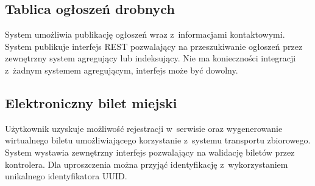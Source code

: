 \documentclass[12pt]{article}
\begin{document}
        \subsection*{Tablica ogłoszeń drobnych}
            System umożliwia publikację ogłoszeń wraz z~informacjami kontaktowymi. System publikuje interfejs REST pozwalający na przeszukiwanie ogłoszeń przez zewnętrzny system agregujący lub indeksujący. Nie ma konieczności integracji z~żadnym systemem agregującym, interfejs może być dowolny.

        \subsection*{Elektroniczny bilet miejski}
            Użytkownik uzyskuje możliwość rejestracji w~serwisie oraz wygenerowanie wirtualnego biletu umożliwiającego korzystanie z~systemu transportu zbiorowego. System wystawia zewnętrzny interfejs pozwalający na walidację biletów przez kontrolera. Dla uproszczenia można przyjąć identyfikację z~wykorzystaniem unikalnego identyfikatora UUID.
\end{document}
